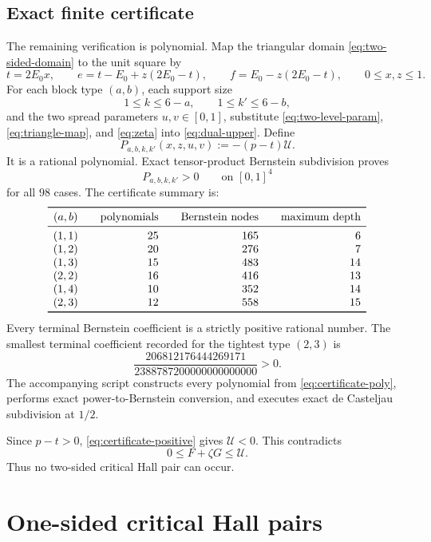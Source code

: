 \documentclass[11pt]{article}
\theoremstyle{definition}
\newcommand{\cU}{\mathcal U}
\begin{document}
\subsection{Exact finite certificate}

The remaining verification is polynomial.  Map the triangular domain
\eqref{eq:two-sided-domain} to the unit square by
\begin{equation}\label{eq:triangle-map}
 t=2E_0x,
 \qquad
 e=t-E_0+z(2E_0-t),
 \qquad
 f=E_0-z(2E_0-t),
 \qquad 0\le x,z\le1.
\end{equation}
For each block type $(a,b)$, each support size
\[
 1\le k\le6-a,\qquad 1\le k'\le6-b,
\]
and the two spread parameters $u,v\in[0,1]$, substitute
\eqref{eq:two-level-param}, \eqref{eq:triangle-map}, and
\eqref{eq:zeta} into \eqref{eq:dual-upper}.  Define
\begin{equation}\label{eq:certificate-poly}
 P_{a,b,k,k'}(x,z,u,v):=-(p-t)\cU.
\end{equation}
It is a rational polynomial.  Exact tensor-product Bernstein subdivision
proves
\begin{equation}\label{eq:certificate-positive}
 P_{a,b,k,k'}>0\qquad\text{on }[0,1]^4
\end{equation}
for all $98$ cases.  The certificate summary is:
\[
\begin{array}{c@{\qquad}r@{\qquad}r@{\qquad}r}
\toprule
(a,b)&\text{polynomials}&\text{Bernstein nodes}&\text{maximum depth}\\
\midrule
(1,1)&25&165&6\\
(1,2)&20&276&7\\
(1,3)&15&483&14\\
(2,2)&16&416&13\\
(1,4)&10&352&14\\
(2,3)&12&558&15\\
\bottomrule
\end{array}
\]
Every terminal Bernstein coefficient is a strictly positive rational number.
The smallest terminal coefficient recorded for the tightest type $(2,3)$ is
\[
 \frac{206812176444269171}
 {2388787200000000000000}>0.
\]
The accompanying script constructs every polynomial from
\eqref{eq:certificate-poly}, performs exact power-to-Bernstein conversion,
and executes exact de Casteljau subdivision at $1/2$.

Since $p-t>0$, \eqref{eq:certificate-positive} gives $\cU<0$.  This
contradicts
\[
 0\le F+\zeta G\le\cU.
\]
Thus no two-sided critical Hall pair can occur.

\section{One-sided critical Hall pairs}
\end{document}
